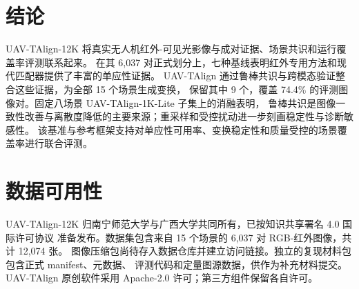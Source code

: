 
\section{结论}

UAV-TAlign-12K 将真实无人机红外-可见光影像与成对证据、场景共识和运行覆盖率评测联系起来。
在其 6,037 对正式划分上，七种基线表明红外专用方法和现代匹配器提供了丰富的单应性证据。
UAV-TAlign 通过鲁棒共识与跨模态验证整合这些证据，为全部 15 个场景生成变换，
保留其中 9 个，覆盖 74.4\% 的评测图像对。固定八场景 UAV-TAlign-1K-Lite 子集上的消融表明，
鲁棒共识是图像一致性改善与离散度降低的主要来源；重采样和受控扰动进一步刻画稳定性与诊断敏感性。
该基准与参考框架支持对单应性可用率、变换稳定性和质量受控的场景覆盖率进行联合评测。

\section*{数据可用性}

UAV-TAlign-12K 归南宁师范大学与广西大学共同所有，已按知识共享署名 4.0 国际许可协议
准备发布。数据集包含来自 15 个场景的 6,037 对 RGB-红外图像，共计 12,074 张。
图像压缩包尚待存入数据仓库并建立访问链接。独立的复现材料包包含正式 manifest、元数据、
评测代码和定量图源数据，供作为补充材料提交。UAV-TAlign 原创软件采用
Apache-2.0 许可；第三方组件保留各自许可。

